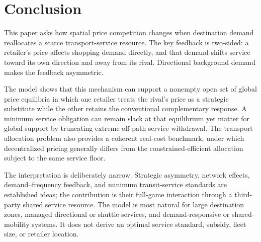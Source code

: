 \section{Conclusion}\label{sec:conclusion}

This paper asks how spatial price competition changes when destination demand reallocates a scarce transport-service resource. The key feedback is two-sided: a retailer's price affects shopping demand directly, and that demand shifts service toward its own direction and away from its rival. Directional background demand makes the feedback asymmetric.

The model shows that this mechanism can support a nonempty open set of global price equilibria in which one retailer treats the rival's price as a strategic substitute while the other retains the conventional complementary response. A minimum service obligation can remain slack at that equilibrium yet matter for global support by truncating extreme off-path service withdrawal. The transport allocation problem also provides a coherent real-cost benchmark, under which decentralized pricing generally differs from the constrained-efficient allocation subject to the same service floor.

The interpretation is deliberately narrow. Strategic asymmetry, network effects, demand--frequency feedback, and minimum transit-service standards are established ideas; the contribution is their full-game interaction through a third-party shared service resource. The model is most natural for large destination zones, managed directional or shuttle services, and demand-responsive or shared-mobility systems. It does not derive an optimal service standard, subsidy, fleet size, or retailer location.
